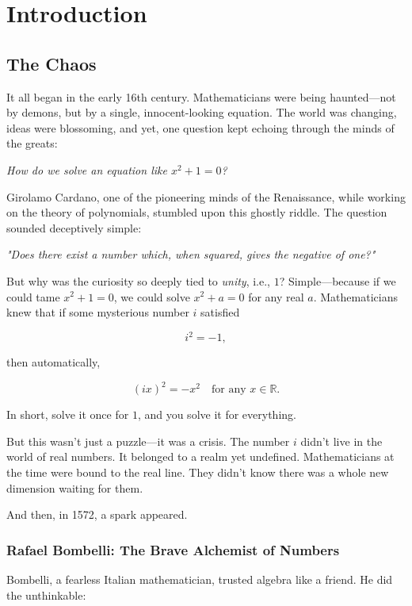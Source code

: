 \chapter{Introduction}

\section{The Chaos}

It all began in the early 16th century. Mathematicians were being haunted—not by demons, but by a single, innocent-looking equation. The world was changing, ideas were blossoming, and yet, one question kept echoing through the minds of the greats:

\emph{How do we solve an equation like $x^2 + 1 = 0$?}

Girolamo Cardano, one of the pioneering minds of the Renaissance, while working on the theory of polynomials, stumbled upon this ghostly riddle. The question sounded deceptively simple:

\begin{center}
\emph{"Does there exist a number which, when squared, gives the negative of one?"}
\end{center}

But why was the curiosity so deeply tied to \emph{unity}, i.e., $1$? Simple—because if we could tame $x^2 + 1 = 0$, we could solve $x^2 + a = 0$ for any real $a$. Mathematicians knew that if some mysterious number $i$ satisfied

\[
i^2 = -1,
\]

then automatically,

\[
(ix)^2 = -x^2 \quad \text{for any } x \in \mathbb{R}.
\]

In short, solve it once for $1$, and you solve it for everything.

But this wasn’t just a puzzle—it was a crisis. The number $i$ didn’t live in the world of real numbers. It belonged to a realm yet undefined. Mathematicians at the time were bound to the real line. They didn’t know there was a whole new dimension waiting for them.

And then, in 1572, a spark appeared.

\subsection*{Rafael Bombelli: The Brave Alchemist of Numbers}

Bombelli, a fearless Italian mathematician, trusted algebra like a friend. He did the unthinkable:

